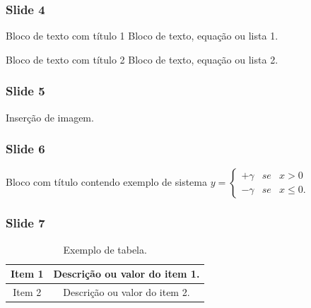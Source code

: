 \documentclass{beamer}
\begin{document}
\begin{frame}
\frametitle{Slide 4}

\begin{block}{Bloco de texto com título 1}
Bloco de texto, equação ou lista 1.
\end{block}

\begin{block}{Bloco de texto com título 2}
Bloco de texto, equação ou lista 2.
\end{block}

\end{frame}

\begin{frame}
\frametitle{Slide 5}

Inserção de imagem.
\begin{figure}[!h]
	\centering
\end{figure}

\end{frame}

\begin{frame}
\frametitle{Slide 6}

\begin{block}{Bloco com título contendo exemplo de sistema}
$
y=\left\{\begin{array}{ccc}
	+ \gamma & se & x > 0\\
	- \gamma & se & x \leq 0.
\end{array}\right.
$
\end{block}
\end{frame}

\begin{frame}
\frametitle{Slide 7}

\begin{table}[!h]
\center
\caption{Exemplo de tabela.}
\begin{tabular}{|c|c|}
\hline 
Item 1 & Descrição ou valor do item 1. \\ 
\hline 
Item 2 & Descrição ou valor do item 2. \\ 
\hline 
\end{tabular} 
\end{table}

\end{frame}
\end{document}
